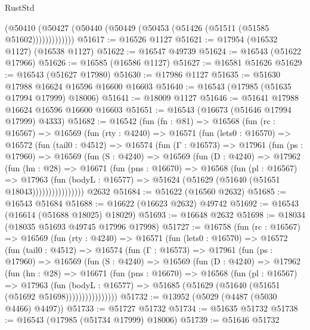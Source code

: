 \begin{lexlean}{RustStd}
\begin{coremodule}
              (@50410 (@50427 (@50440 (@50449 (@50453 (@51426 (@51511 (@51585 @51602)))))))))))))
@51617 := @16526 @1127
@51621 := @17954 (@16532 @1127) (@16538 @1127)
@51622 := @16547 @49739
@51624 := @16543 (@51622 @17966)
@51626 := @16585 (@16586 @1127)
@51627 := @16581 @51626
@51629 := @16543 (@51627 @17980)
@51630 := @17986 @1127
@51635 := @51630 @17988 @16624 @16596 @16600 @16603
@51640 := @16543 (@17985 (@51635 @17994 @17999) @18006)
@51641 := @18009 @1127
@51646 := @51641 @17988 @16624 @16596 @16600 @16603
@51651 := @16543 (@16673 (@51646 @17994 @17999) @4333)
@51682 := @16542
    (fun (fn : @81) =>
    @16568
      (fun (rc : @16567) =>
      @16569
        (fun (rty : @4240) =>
        @16571
          (fun (lets0 : @16570) =>
          @16572
            (fun (tail0 : @4512) =>
            @16574
              (fun (Γ : @16573) =>
              @17961
                (fun (ps : @17960) =>
                @16569
                  (fun (S : @4240) =>
                  @16569
                    (fun (D : @4240) =>
                    @17962
                      (fun (hn : @28) =>
                      @16671
                        (fun (pns : @16670) =>
                        @16568
                          (fun (pl : @16567) =>
                          @17963
                            (fun (bodyL : @16577) =>
                            @51624 (@51629 (@51640 (@51651 @18043))))))))))))))))
    @2632
@51684 := @51622 (@16560 @2632)
@51685 := @16543 @51684
@51688 := @16622 (@16623 @2632) @49742
@51692 := @16543 (@16614 (@51688 @18025) @18029)
@51693 := @16648 @2632
@51698 := @18034 (@18035 @51693 @49745 @17996 @17998)
@51727 := @16758
    (fun (rc : @16567) =>
    @16569
      (fun (rty : @4240) =>
      @16571
        (fun (lets0 : @16570) =>
        @16572
          (fun (tail0 : @4512) =>
          @16574
            (fun (Γ : @16573) =>
            @17961
              (fun (ps : @17960) =>
              @16569
                (fun (S : @4240) =>
                @16569
                  (fun (D : @4240) =>
                  @17962
                    (fun (hn : @28) =>
                    @16671
                      (fun (pns : @16670) =>
                      @16568
                        (fun (pl : @16567) =>
                        @17963
                          (fun (bodyL : @16577) =>
                          @51685 (@51629 (@51640 (@51651 (@51692 @51698))))))))))))))))
@51732 := @13952 (@5029 (@4487 (@5030 @4466) @4497))
@51733 := @51727 @51732
@51734 := @51635 @51732
@51738 := @16543 (@17985 (@51734 @17999) @18006)
@51739 := @51646 @51732

\end{coremodule}
\end{lexlean}
